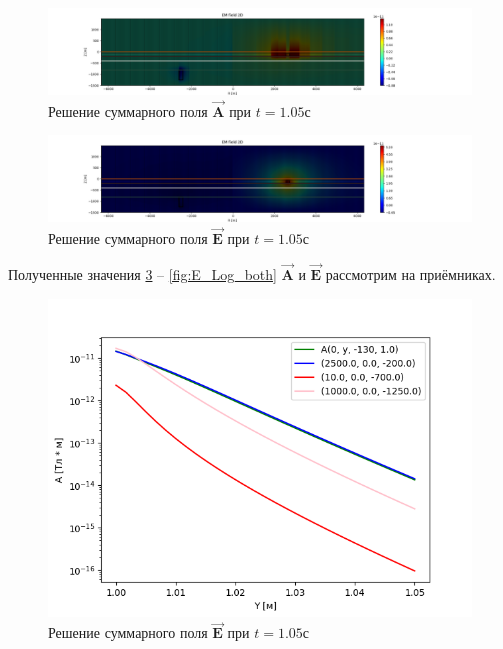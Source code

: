 \begin{figure}
	\centering
	\includegraphics[width=1.0\linewidth]{images/Answer_A_both_time_layer_1.05.png}
	\caption{Решение суммарного поля $\overrightarrow{\textbf{A}}$ при $t = 1.05с$}
	\label{fig:A_both_t2}
\end{figure} 


\begin{figure}
	\centering
	\includegraphics[width=1.0\linewidth]{images/Answer_E_both_time_layer_1.05.png}
	\caption{Решение суммарного поля $\overrightarrow{\textbf{E}}$ при $t = 1.05с$}
	\label{fig:E_both_t2}
\end{figure} 

Полученные значения \ref{fig:A_Log_both} -- \ref{fig:E_Log_both} $\overrightarrow{\textbf{A}}$ и $\overrightarrow{\textbf{E}}$ рассмотрим на приёмниках.

\begin{figure}
	\centering
	\includegraphics[width=0.8\linewidth]{images/Log_A_both.png}
	\caption{Решение суммарного поля $\overrightarrow{\textbf{E}}$ при $t = 1.05с$}
	\label{fig:A_Log_both}
\end{figure} 


